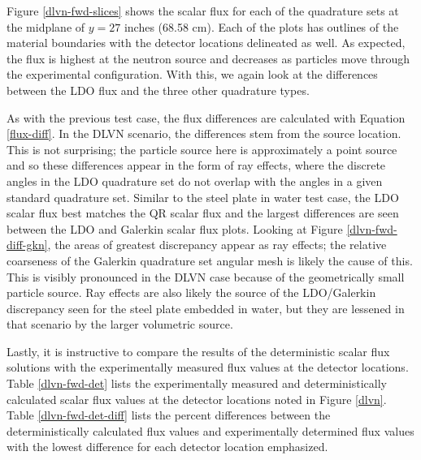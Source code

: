 \documentclass{article} %
\begin{document}
Figure \ref{dlvn-fwd-slices} shows the scalar flux for each of the
quadrature sets at the midplane of $y = 27$ inches (68.58 cm).
Each of the plots has outlines of the material boundaries with the detector
locations delineated as well. As expected, the flux is highest at the neutron
source and decreases as particles move through the experimental configuration.
With this, we again look at the differences between the LDO flux
and the three other quadrature types. 

As with the previous test case, the flux differences 
are calculated with Equation \eqref{flux-diff}. In the DLVN scenario, the 
differences stem from the source location. This is not surprising; the particle
source here is approximately a point source and so these differences appear in
the form of ray effects, where the discrete angles in the LDO quadrature set do
not overlap with the angles in a given standard quadrature set. Similar to the
steel plate in water test case, the LDO scalar flux best matches the QR scalar
flux and the largest differences are seen between the LDO and Galerkin scalar
flux plots. Looking at Figure \ref{dlvn-fwd-diff-gkn}, the areas of greatest
discrepancy appear as ray effects; the relative coarseness of the
Galerkin quadrature set angular mesh is likely the cause of
this. This is visibly pronounced in the DLVN case because of the geometrically
small particle source. Ray effects are also likely the source of the 
LDO/Galerkin discrepancy seen for the steel plate embedded in water, but
they are lessened in that scenario by the larger volumetric source.

Lastly, it is instructive to compare the results of the deterministic
scalar flux solutions with the experimentally measured flux values at the
detector locations. Table \ref{dlvn-fwd-det} lists the experimentally measured
\cite{dlvn1991} and deterministically calculated scalar flux values at the
detector locations noted in Figure \ref{dlvn}. Table \ref{dlvn-fwd-det-diff}
lists the percent differences between the deterministically calculated flux
values and experimentally determined flux values with the lowest difference
for each detector location emphasized.
\end{document}
